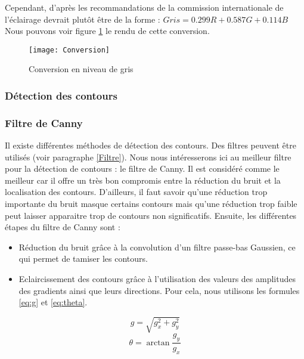 Cependant, d’après les recommandations de la commission internationale de l’éclairage devrait plutôt être de la forme : $Gris = 0.299R + 0.587G + 0.114B$
Nous pouvons voir figure \ref{fig:Conversion} le rendu de cette conversion.

\begin{figure}[h]
  \centering
  \texttt{[image: Conversion]}
  \caption{Conversion en niveau de gris}
  \label{fig:Conversion}
\end{figure}

\subsubsection{Détection des contours}

\subsubsection*{Filtre de Canny}

Il existe différentes méthodes de détection des contours. Des filtres peuvent être utilisés (voir paragraphe \ref{Filtre}). Nous nous intéresserons ici au meilleur filtre pour la détection de contours : le filtre de Canny. Il est considéré comme le meilleur car il offre un très bon compromis entre la réduction du bruit et la localisation des contours. D’ailleurs, il faut savoir qu’une réduction trop importante du bruit masque certains contours mais qu’une réduction trop faible peut laisser apparaitre trop de contours non significatifs. Ensuite, les différentes étapes du filtre de Canny sont :
\begin{itemize}[label=\textbullet,font=\color{black}]
\item Réduction du bruit grâce à la convolution d’un filtre passe-bas Gaussien, ce qui permet de tamiser les contours.
\item Eclaircissement des contours grâce à l’utilisation des valeurs des amplitudes des gradients ainsi que leurs directions. Pour cela, nous utilisons les formules \eqref{eq:g} et \eqref{eq:theta}.
\end{itemize}

\begin{equation}
g = \sqrt{g_x^2 + g_y^2}
\label{eq:g}
\end{equation}
\begin{equation}
\theta = \arctan{\frac{g_y}{g_x}}
\label{eq:theta}
\end{equation}

